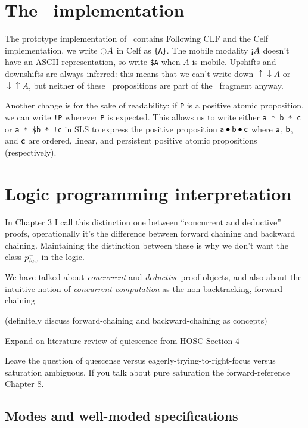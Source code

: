 \section{The \sls~implementation}
\label{sec:prototype}

The prototype implementation of \sls~contains 
Following CLF and the Celf implementation, we write ${\ocircle}A$ in
Celf as \verb|{A}|. The mobile modality ${\gnab}A$ doesn't have an
ASCII representation, so write \verb|$A| when $A$ is
mobile. Upshifts and downshifts are always inferred: this means that
we can't write down ${\uparrow}{\downarrow}A$ or
${\downarrow}{\uparrow}A$, but neither of these \ollll~propositions
are part of the \sls~fragment anyway.

Another change is for the sake of readability: if \verb|P| is a
positive atomic proposition, we can write \verb|!P| wherever \verb|P|
is expected. This allows us to write either \verb|a * b * c| or
\verb|a * $b * !c| in SLS to express the positive proposition ${\sf a}
\mathbin{\bullet} {\sf b} \mathbin{\bullet} {\sf c}$ where ${\sf a}$, ${\sf b}$, and ${\sf c}$
are ordered, linear, and persistent positive atomic propositions
(respectively).

\section{Logic programming interpretation}
\label{sec:framework-logicprog}

In Chapter 3 I call this distinction one between ``concurrent and deductive''
proofs, operationally it's the difference between forward chaining 
and backward chaining. Maintaining the distinction between these is why
we don't want the class $p^-_{\it lax}$ in the logic.

We have talked about {\it concurrent} and {\it deductive} proof
objects, and also about the intuitive notion of {\it concurrent
  computation} as the non-backtracking, forward-chaining 

(definitely discuss forward-chaining and backward-chaining as concepts)

Expand on literature review of quiescence from HOSC Section 4

Leave the question of quescense versus eagerly-trying-to-right-focus
versus saturation ambiguous. If you talk about pure saturation the
forward-reference Chapter 8. 

\subsection{Modes and well-moded specifications}
\label{sec:framework-modes}

